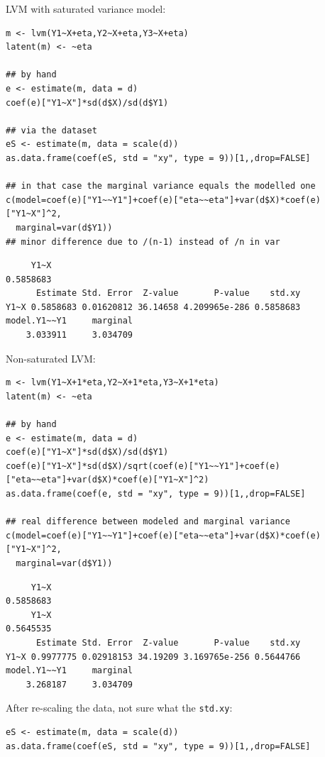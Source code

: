 \documentclass{article}
\begin{document}
LVM with saturated variance model:
\lstset{language=r,label= ,caption= ,captionpos=b,numbers=none}
\begin{lstlisting}
m <- lvm(Y1~X+eta,Y2~X+eta,Y3~X+eta)
latent(m) <- ~eta

## by hand
e <- estimate(m, data = d)
coef(e)["Y1~X"]*sd(d$X)/sd(d$Y1)

## via the dataset
eS <- estimate(m, data = scale(d))
as.data.frame(coef(eS, std = "xy", type = 9))[1,,drop=FALSE]

## in that case the marginal variance equals the modelled one
c(model=coef(e)["Y1~~Y1"]+coef(e)["eta~~eta"]+var(d$X)*coef(e)["Y1~X"]^2,
  marginal=var(d$Y1))
## minor difference due to /(n-1) instead of /n in var
\end{lstlisting}

\begin{verbatim}
     Y1~X 
0.5858683
      Estimate Std. Error  Z-value       P-value    std.xy
Y1~X 0.5858683 0.01620812 36.14658 4.209965e-286 0.5858683
model.Y1~~Y1     marginal 
    3.033911     3.034709
\end{verbatim}

Non-saturated LVM:
\lstset{language=r,label= ,caption= ,captionpos=b,numbers=none}
\begin{lstlisting}
m <- lvm(Y1~X+1*eta,Y2~X+1*eta,Y3~X+1*eta)
latent(m) <- ~eta

## by hand
e <- estimate(m, data = d)
coef(e)["Y1~X"]*sd(d$X)/sd(d$Y1)
coef(e)["Y1~X"]*sd(d$X)/sqrt(coef(e)["Y1~~Y1"]+coef(e)["eta~~eta"]+var(d$X)*coef(e)["Y1~X"]^2)
as.data.frame(coef(e, std = "xy", type = 9))[1,,drop=FALSE]

## real difference between modeled and marginal variance
c(model=coef(e)["Y1~~Y1"]+coef(e)["eta~~eta"]+var(d$X)*coef(e)["Y1~X"]^2,
  marginal=var(d$Y1))
\end{lstlisting}

\begin{verbatim}
     Y1~X 
0.5858683
     Y1~X 
0.5645535
      Estimate Std. Error  Z-value       P-value    std.xy
Y1~X 0.9977775 0.02918153 34.19209 3.169765e-256 0.5644766
model.Y1~~Y1     marginal 
    3.268187     3.034709
\end{verbatim}

After re-scaling the data, not sure what the \texttt{std.xy}:
\lstset{language=r,label= ,caption= ,captionpos=b,numbers=none}
\begin{lstlisting}
eS <- estimate(m, data = scale(d))
as.data.frame(coef(eS, std = "xy", type = 9))[1,,drop=FALSE]
\end{lstlisting}
\end{document}
